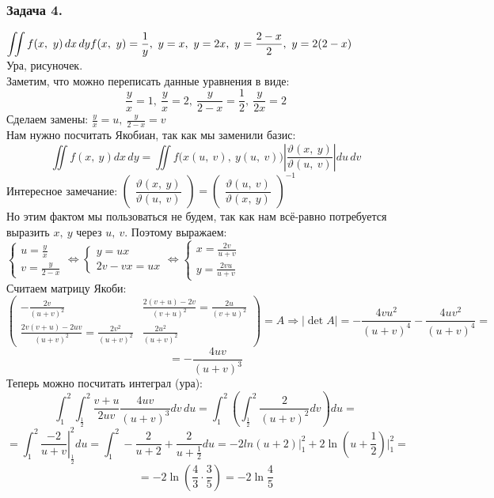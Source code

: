 \documentclass[12pt, letterpaper, twoside]{article}
\newcommand{\Abs}[1]{\left| #1 \right|}
\begin{document}
    \subsubsection*{Задача 4.}
    $\displaystyle\iint f(x,\ y)\, dx\, dy\\
    f(x,\ y) = \frac{1}{y},\ y = x,\ y = 2x,\ y = \frac{2 - x}{2},\ y = 2(2 - x)$\\
    Ура, рисуночек.\\
    Заметим, что можно переписать данные уравнения в виде:
    \[\frac{y}{x} = 1,\ \frac{y}{x} = 2,\ \frac{y}{2 - x} = \frac{1}{2},\ \frac{y}{2x} = 2\]
    Сделаем замены: $\displaystyle\frac{y}{x} = u,\ \frac{y}{2 - x} = v$\\
    Нам нужно посчитать Якобиан, так как мы заменили базис:
    \[\iint f(x,\ y) dx\, dy = \iint f\big( x(u,\ v),\ y(u,\ v) \big) \Abs{\frac{\vartheta(x,\ y)}{\vartheta(u,\ v)}}du\, dv\]
    Интересное замечание: $\begin{pmatrix}
        \dfrac{\vartheta(x,\ y)}{\vartheta(u,\ v)}
    \end{pmatrix} = \begin{pmatrix}
        \dfrac{\vartheta(u,\ v)}{\vartheta(x,\ y)}
    \end{pmatrix}^{-1}$\\
    Но этим фактом мы пользоваться не будем, так как нам всё-равно потребуется выразить $x,\ y$ через $u,\ v$. Поэтому выражаем:\\
    $\begin{cases}
        u = \frac{y}{x}\\
        v = \frac{y}{2 - x}
    \end{cases}\Leftrightarrow \begin{cases}
        y = ux\\
        2v - vx = ux
    \end{cases}\Leftrightarrow \begin{cases}
        x = \frac{2v}{u + v}\\
        y = \frac{2vu}{u + v}
    \end{cases}$\\
    Считаем матрицу Якоби:
    \[\begin{pmatrix}
        -\frac{2v}{(u + v)^2} & \frac{2(v + u) - 2v}{(v + u)^2} = \frac{2u}{(v + u)^2}\\
        \frac{2v(v + u) - 2uv}{(u + v)^2} = \frac{2v^2}{(u + v)^2} &  \frac{2u^2}{(u + v)^2}
    \end{pmatrix} = A\Rightarrow \Abs{\det A} = -\frac{4vu^2}{(u + v)^4} - \frac{4uv^2}{(u + v)^4} =\]
    \[ =-\frac{4uv}{(u + v)^3}\]
    Теперь можно посчитать интеграл (ура):
    \[\int_1^2\int_{\frac{1}{2}}^{2} \frac{v + u}{2uv} \frac{4uv}{(u + v)^3}dv\, du = \int_1^2 \left(\int_{\frac{1}{2}}^{2} \frac{2}{(u + v)^2} dv\right)du =\]
    \[= \int_1^2 \left.\frac{-2}{u + v}\right|_{\frac{1}{2}}^2 du = \int_1^2 -\frac{2}{u + 2} + \frac{2}{u + \frac{1}{2}}du = -2ln(u + 2)\Big|_1^2 + 2\ln(u + \frac{1}{2})\Big|_1^2 =\]
    \[=-2\ln\left( \frac{4}{3}\cdot \frac{3}{5} \right) = -2\ln \frac{4}{5}\]
\end{document}
